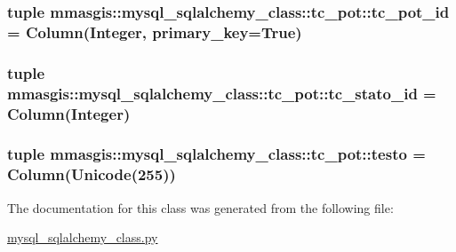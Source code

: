 \label{classmmasgis_1_1mysql__sqlalchemy__class_1_1tc__pot_a37ce5423b68c5decf070cb68259e2cd8}
\hypertarget{classmmasgis_1_1mysql__sqlalchemy__class_1_1tc__pot_a97da353180cf4f6b3fc78cb86f3d0789}{
\subsubsection[{tc\_\-pot\_\-id}]{\setlength{\rightskip}{0pt plus 5cm}tuple {\bf mmasgis::mysql\_\-sqlalchemy\_\-class::tc\_\-pot::tc\_\-pot\_\-id} = Column(Integer, primary\_\-key=True)}}
\label{classmmasgis_1_1mysql__sqlalchemy__class_1_1tc__pot_a97da353180cf4f6b3fc78cb86f3d0789}
\hypertarget{classmmasgis_1_1mysql__sqlalchemy__class_1_1tc__pot_a294454e7001bafd8656adb716d493876}{
\subsubsection[{tc\_\-stato\_\-id}]{\setlength{\rightskip}{0pt plus 5cm}tuple {\bf mmasgis::mysql\_\-sqlalchemy\_\-class::tc\_\-pot::tc\_\-stato\_\-id} = Column(Integer)}}
\label{classmmasgis_1_1mysql__sqlalchemy__class_1_1tc__pot_a294454e7001bafd8656adb716d493876}
\hypertarget{classmmasgis_1_1mysql__sqlalchemy__class_1_1tc__pot_a3e31f23bf11ba8560fddfaa90d766e5c}{
\subsubsection[{testo}]{\setlength{\rightskip}{0pt plus 5cm}tuple {\bf mmasgis::mysql\_\-sqlalchemy\_\-class::tc\_\-pot::testo} = Column(Unicode(255))}}
\label{classmmasgis_1_1mysql__sqlalchemy__class_1_1tc__pot_a3e31f23bf11ba8560fddfaa90d766e5c}


The documentation for this class was generated from the following file:\begin{DoxyCompactItemize}
\item 
\hyperlink{mysql__sqlalchemy__class_8py}{mysql\_\-sqlalchemy\_\-class.py}\end{DoxyCompactItemize}
